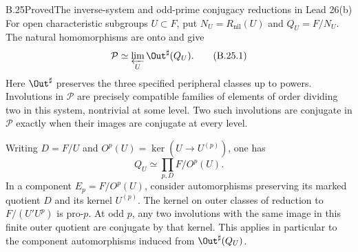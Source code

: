 \begin{statement}{B.25}{Proved}{The inverse-system and odd-prime conjugacy reductions in Lead 26(b)}
For open characteristic subgroups $U\subset F$, put
$N_U=R_{\mathrm{nil}}(U)$ and $Q_U=F/N_U$.
The natural homomorphisms are onto and give
\[
 \mathcal P\simeq
 \varprojlim_U\Out^\sharp(Q_U).
 \tag{B.25.1}
\]
Here $\Out^\sharp$ preserves the three specified peripheral
classes up to powers. Involutions in $\mathcal P$ are precisely
compatible families of elements of order dividing two in this
system, nontrivial at some level. Two such involutions are
conjugate in $\mathcal P$ exactly when their images are
conjugate at every level.

Writing $D=F/U$ and $O^p(U)=\ker(U\to U^{(p)})$, one has
\[
 Q_U\simeq\mathop{\prod}_{p,D}F/O^p(U).
 \tag{B.25.2}
\]
In a component $E_p=F/O^p(U)$, consider automorphisms
preserving its marked quotient $D$ and its kernel $U^{(p)}$.
The kernel on outer classes of reduction to $F/(U'U^p)$ is
pro-$p$. At odd $p$, any two involutions with the same image
in this finite outer quotient are conjugate by that kernel.
This applies in particular to the component automorphisms
induced from $\Out^\sharp(Q_U)$.
\end{statement}
